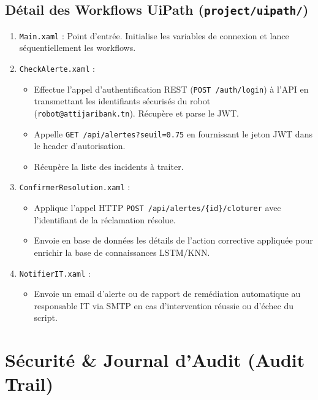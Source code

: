 \documentclass[11pt,a4paper]{article}
\begin{document}
\subsection{Détail des Workflows UiPath (\texttt{project/uipath/})}
\begin{enumerate}
    \item \texttt{Main.xaml} : Point d'entrée. Initialise les variables de connexion et lance séquentiellement les workflows.
    \item \texttt{CheckAlerte.xaml} :
    \begin{itemize}
        \item Effectue l'appel d'authentification REST (\texttt{POST /auth/login}) à l'API en transmettant les identifiants sécurisés du robot (\texttt{robot@attijaribank.tn}). Récupère et parse le JWT.
        \item Appelle \texttt{GET /api/alertes?seuil=0.75} en fournissant le jeton JWT dans le header d'autorisation.
        \item Récupère la liste des incidents à traiter.
    \end{itemize}
    \item \texttt{ConfirmerResolution.xaml} :
    \begin{itemize}
        \item Applique l'appel HTTP \texttt{POST /api/alertes/\{id\}/cloturer} avec l'identifiant de la réclamation résolue.
        \item Envoie en base de données les détails de l'action corrective appliquée pour enrichir la base de connaissances LSTM/KNN.
    \end{itemize}
    \item \texttt{NotifierIT.xaml} : 
    \begin{itemize}
        \item Envoie un email d'alerte ou de rapport de remédiation automatique au responsable IT via SMTP en cas d'intervention réussie ou d'échec du script.
    \end{itemize}
\end{enumerate}

\section{Sécurité \& Journal d'Audit (Audit Trail)}
\end{document}
